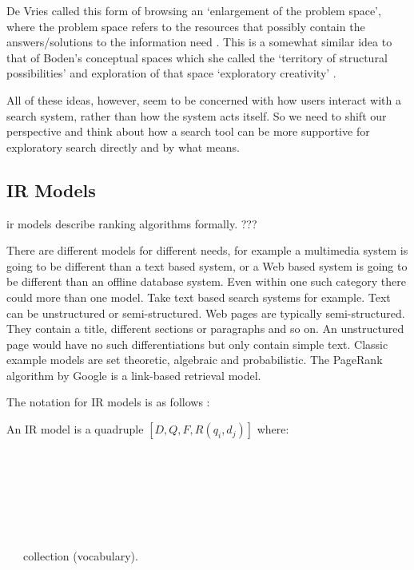 De Vries called this form of browsing an `enlargement of the problem space', where the problem space refers to the resources that possibly contain the answers/solutions to the information need \autocite{DeVries1993}. This is a somewhat similar idea to that of Boden’s conceptual spaces which she called the `territory of structural possibilities' and exploration of that space `exploratory creativity' \autocite{Boden2003}.

All of these ideas, however, seem to be concerned with how users interact with a search system, rather than how the system acts itself. So we need to shift our perspective and think about how a search tool can be more supportive for exploratory search directly and by what means.


\subsection{IR Models}
\label{s:irmodels}

\begin{fcom}
  \ac{ir} models describe ranking algorithms formally. ???
\end{fcom}

There are different models for different needs, for example a multimedia system is going to be different than a text based system, or a Web based system is going to be different than an offline database system. Even within one such category there could more than one model. Take text based search systems for example. Text can be unstructured or semi-structured. Web pages are typically semi-structured. They contain a title, different sections or paragraphs and so on. An unstructured page would have no such differentiations but only contain simple text.  Classic example models are set theoretic, algebraic and probabilistic. The PageRank algorithm by Google is a link-based retrieval model.

The notation for \ac{IR} models is as follows \autocite[adapted from][p.58]{Baeza-Yates2011}:

An \ac{IR} model is a quadruple $[D,Q,F,R(q_i, d_j)]$ where:\\
 \\
 \\
 \\
\itab{}    \\
            \\
 \\
 \\
\itab{}     \tab~~~{collection (vocabulary).}

